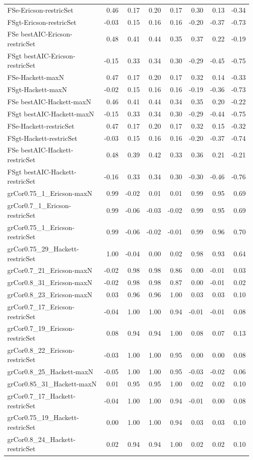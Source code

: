 {\begin{landscape}
\begin{footnotesize}
\begin{longtable}{@{}l|rrrrrrr@{}}
FSe-Ericson-restricSet            & 0.46 & 0.17 & 0.20 & 0.17 & 0.30 & 0.13 & -0.34\tabularnewline
FSgt-Ericson-restricSet           & -0.03 & 0.15 & 0.16 & 0.16 & -0.20 & -0.37 & -0.73\tabularnewline
FSe bestAIC-Ericson-restricSet    & 0.48 & 0.41 & 0.44 & 0.35 & 0.37 & 0.22 & -0.19\tabularnewline
FSgt bestAIC-Ericson-restricSet   & -0.15 & 0.33 & 0.34 & 0.30 & -0.29 & -0.45 & -0.75\tabularnewline
FSe-Hackett-maxN                  & 0.47 & 0.17 & 0.20 & 0.17 & 0.32 & 0.14 & -0.33\tabularnewline
FSgt-Hackett-maxN                 & -0.02 & 0.15 & 0.16 & 0.16 & -0.19 & -0.36 & -0.73\tabularnewline
FSe bestAIC-Hackett-maxN          & 0.46 & 0.41 & 0.44 & 0.34 & 0.35 & 0.20 & -0.22\tabularnewline
FSgt bestAIC-Hackett-maxN         & -0.15 & 0.33 & 0.34 & 0.30 & -0.29 & -0.44 & -0.75\tabularnewline
FSe-Hackett-restricSet            & 0.47 & 0.17 & 0.20 & 0.17 & 0.32 & 0.15 & -0.32\tabularnewline
FSgt-Hackett-restricSet           & -0.03 & 0.15 & 0.16 & 0.16 & -0.20 & -0.37 & -0.74\tabularnewline
FSe bestAIC-Hackett-restricSet    & 0.48 & 0.39 & 0.42 & 0.33 & 0.36 & 0.21 & -0.21\tabularnewline
FSgt bestAIC-Hackett-restricSet   & -0.16 & 0.33 & 0.34 & 0.30 & -0.30 & -0.46 & -0.76\tabularnewline
grCor0.75\_1\_Ericson-maxN        & 0.99 & -0.02 & 0.01 & 0.01 & 0.99 & 0.95 & 0.69\tabularnewline
grCor0.7\_1\_Ericson-restricSet   & 0.99 & -0.06 & -0.03 & -0.02 & 0.99 & 0.95 & 0.69\tabularnewline
grCor0.75\_1\_Ericson-restricSet  & 0.99 & -0.06 & -0.02 & -0.01 & 0.99 & 0.96 & 0.70\tabularnewline
grCor0.75\_29\_Hackett-restricSet & 1.00 & -0.04 & 0.00 & 0.02 & 0.98 & 0.93 & 0.64\tabularnewline
grCor0.7\_21\_Ericson-maxN        & -0.02 & 0.98 & 0.98 & 0.86 & 0.00 & -0.01 & 0.03\tabularnewline
grCor0.8\_31\_Ericson-maxN        & -0.02 & 0.98 & 0.98 & 0.87 & 0.00 & -0.01 & 0.02\tabularnewline
grCor0.8\_23\_Ericson-maxN        & 0.03 & 0.96 & 0.96 & 1.00 & 0.03 & 0.03 & 0.10\tabularnewline
grCor0.7\_17\_Ericson-restricSet  & -0.04 & 1.00 & 1.00 & 0.94 & -0.01 & -0.01 & 0.08\tabularnewline
grCor0.7\_19\_Ericson-restricSet  & 0.08 & 0.94 & 0.94 & 1.00 & 0.08 & 0.07 & 0.13\tabularnewline
grCor0.8\_22\_Ericson-restricSet  & -0.03 & 1.00 & 1.00 & 0.95 & 0.00 & 0.00 & 0.08\tabularnewline
grCor0.8\_25\_Hackett-maxN        & -0.05 & 1.00 & 1.00 & 0.95 & -0.03 & -0.02 & 0.06\tabularnewline
grCor0.85\_31\_Hackett-maxN       & 0.01 & 0.95 & 0.95 & 1.00 & 0.02 & 0.02 & 0.10\tabularnewline
grCor0.7\_17\_Hackett-restricSet  & -0.04 & 1.00 & 1.00 & 0.94 & -0.01 & 0.00 & 0.08\tabularnewline
grCor0.75\_19\_Hackett-restricSet & 0.00 & 1.00 & 1.00 & 0.94 & 0.03 & 0.03 & 0.10\tabularnewline
grCor0.8\_24\_Hackett-restricSet  & 0.02 & 0.94 & 0.94 & 1.00 & 0.02 & 0.02 & 0.10\tabularnewline

\end{longtable}
\end{footnotesize}
\end{landscape}}
